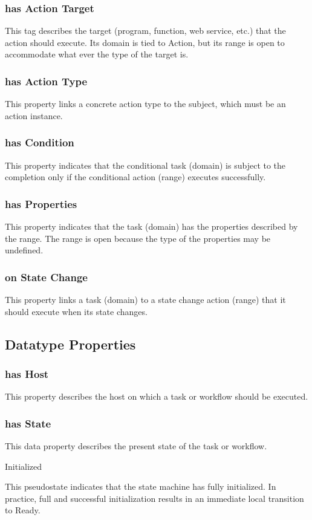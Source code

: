 			\subsubsection{
			has Action Target
			}
			This tag describes the target (program, function, web service, etc.) that the action should execute. Its domain is tied to Action, but its range is open to accommodate what ever the type of the target is.
			\subsubsection{
			has Action Type
			}
			This property links a concrete action type to the subject, which must be an action instance.
			\subsubsection{
			has Condition
			}
			This property indicates that the conditional task (domain) is subject to the completion only if the conditional action (range) executes successfully.
			\subsubsection{
			has Properties
			}
			This property indicates that the task (domain) has the properties described by the range. The range is open because the type of the properties may be undefined.
			\subsubsection{
			on State Change
			}
			This property links a task (domain) to a state change action (range) that it should execute when its state changes.
\subsection{Datatype Properties}
			\subsubsection{
			has Host
			}
			This property describes the host on which a task or workflow should be executed.
			\subsubsection{
			has State
			}
			This data property describes the present state of the task or workflow.

Initialized

This pseudostate indicates that the state machine has fully initialized. In practice, full and successful initialization results in an immediate local transition to Ready.

